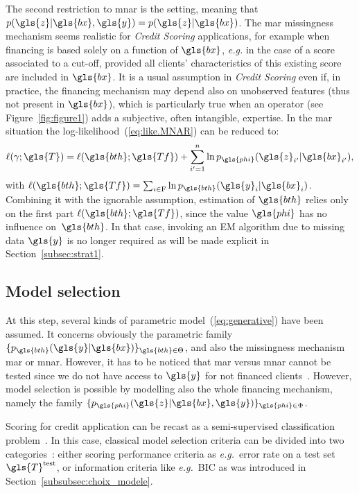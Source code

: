 The second restriction to \gls{mnar} is the  setting, meaning that $p(\gls{z}| \gls{bx},\gls{y}) = p(\gls{z}|\gls{bx})$. The \gls{mar} missingness mechanism seems realistic for \textit{Credit Scoring} applications, for example when financing is based solely on a function of $\gls{bx}$, {\it e.g.} in the case of a score associated to a cut-off, provided all clients' characteristics of this existing \gls{score} are included in $\gls{bx}$. It is a usual assumption in \textit{Credit Scoring} even if, in practice, the financing mechanism may depend also on unobserved features (thus not present in $\gls{bx}$), which is particularly true when an operator (see Figure~\ref{fig:figure1}) adds a subjective, often intangible, expertise. In the \gls{mar} situation the log-likelihood~(\ref{eq:like.MNAR}) can be reduced to:
\begin{equation}\label{eq:like.MAR}
\ell(\gamma;\gls{T}) = \ell(\gls{bth};\gls{Tf}) + \sum_{i'=1}^n \ln p_{\gls{phi}}(\gls{z}_{i'} | \gls{bx}_{i'}),
\end{equation}
with $\ell(\gls{bth};\gls{Tf})=\sum_{i\in\text{F}}\ln p_{\gls{bth}}(\gls{y}_i | \gls{bx}_i)$.
Combining it with the ignorable assumption, estimation of $\gls{bth}$ relies only on the first part $\ell(\gls{bth};\gls{Tf})$, since the value $\gls{phi}$ has no influence on~$\gls{bth}$. In that case, invoking an EM algorithm due to missing data $\gls{y}$ is no longer required as will be made explicit in Section~\ref{subsec:strat1}.

\subsection{Model selection} \label{subsec:model_selection}

At this step, several kinds of parametric model~(\ref{eq:generative}) have been assumed. It concerns obviously the parametric family $\{p_{\gls{bth}}(\gls{y}|\gls{bx})\}_{\gls{bth} \in\Theta}$, and also the missingness mechanism \gls{mar} or \gls{mnar}. 
However, it has to be noticed that \gls{mar} versus \gls{mnar} cannot be tested since we do not have access to $\gls{y}$ for not financed clients~\cite{molenberghs2008every}. However, model selection is possible by modelling also the whole financing mechanism, namely the family $\{p_{\gls{phi}}(\gls{z}|\gls{bx},\gls{y})\}_{\gls{phi} \in \Phi}$.


Scoring for credit application can be recast as a semi-supervised classification problem~\cite{Chapelle:2010:SL:1841234}. In this case, classical model selection criteria can be divided into two categories~\cite{vandewalle:tel-00447141}: either scoring performance criteria as \textit{e.g.}\ error rate on a test set $\gls{T}^{\text{test}}$, or information criteria like \textit{e.g.}\ BIC as was introduced in Section~\ref{subsubsec:choix_modele}.

